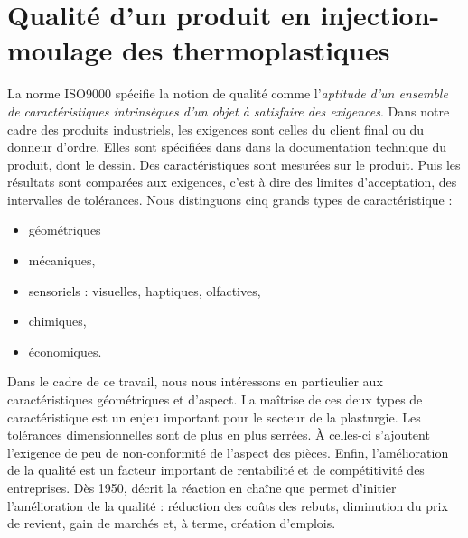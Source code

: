 \section{Qualité d'un produit en injection-moulage des thermoplastiques} \label{sec:quality_definition}

La norme ISO9000 \cite{ISO_9000_2015} spécifie la notion de qualité comme l'\textit{aptitude d'un ensemble de caractéristiques intrinsèques d'un objet à satisfaire des exigences}.
Dans notre cadre des produits industriels, les exigences sont celles du client final ou du donneur d'ordre.
Elles sont spécifiées dans dans la documentation technique du produit, dont le dessin.
Des caractéristiques sont mesurées sur le produit.
Puis les résultats sont comparées aux exigences, c'est à dire des limites d'acceptation, des intervalles de tolérances.
Nous distinguons cinq grands types de caractéristique :
\begin{itemize}
	\item géométriques  %
	\item mécaniques,
	\item sensoriels : visuelles, haptiques, olfactives,
	\item chimiques,
	\item économiques.
\end{itemize}


Dans le cadre de ce travail, nous nous intéressons en particulier aux caractéristiques géométriques et d'aspect.
La maîtrise de ces deux types de caractéristique est un enjeu important pour le secteur de la plasturgie.
Les tolérances dimensionnelles sont de plus en plus serrées.
À celles-ci s'ajoutent l'exigence de peu de non-conformité de l'aspect des pièces.
Enfin, l'amélioration de la qualité est un facteur important de rentabilité et de compétitivité des entreprises.
Dès 1950, \citeauthor{deming_quality_1982} \cite{deming_quality_1982} décrit la réaction en chaîne que permet d'initier l'amélioration de la qualité : réduction des coûts des rebuts, diminution du prix de revient, gain de marchés et, à terme, création d'emplois.

